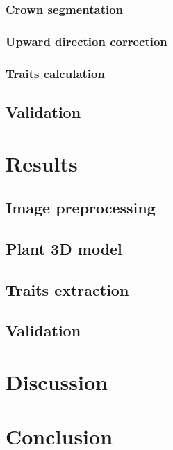 \subsubsection{Crown segmentation}

\subsubsection{Upward direction correction}

\subsubsection{Traits calculation}


\subsection{Validation}




\section{Results}

\subsection{Image preprocessing}



\subsection{Plant 3D model}



\subsection{Traits extraction}




\subsection{Validation}



\section{Discussion}



\section{Conclusion}